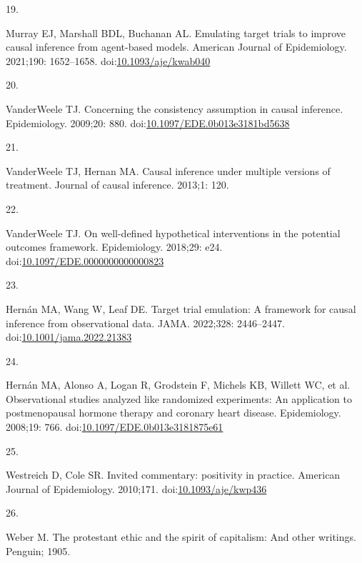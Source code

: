 \documentclass[
  singlecolumn]{article}
\newlength{\cslhangindent}
\newlength{\csllabelwidth}
\newlength{\cslentryspacingunit} %
\newenvironment{CSLReferences}[2] %
 {%
  \setlength{\parindent}{0pt}
  \ifodd #1
  \let\oldpar\par
  \def\par{\hangindent=\cslhangindent\oldpar}
  \fi
  \setlength{\parskip}{#2\cslentryspacingunit}
 }%
 {}
\newcommand{\CSLLeftMargin}[1]{\parbox[t]{\csllabelwidth}{#1}}
\newcommand{\CSLRightInline}[1]{\parbox[t]{\linewidth - \csllabelwidth}{#1}\break}
\begin{document}
\begin{CSLReferences}{0}{0}
\leavevmode{}%
\CSLLeftMargin{19. }%
\CSLRightInline{Murray EJ, Marshall BDL, Buchanan AL. Emulating target
trials to improve causal inference from agent-based models. American
Journal of Epidemiology. 2021;190: 1652--1658.
doi:\href{https://doi.org/10.1093/aje/kwab040}{10.1093/aje/kwab040}}

\leavevmode{}%
\CSLLeftMargin{20. }%
\CSLRightInline{VanderWeele TJ. Concerning the consistency assumption in
causal inference. Epidemiology. 2009;20: 880.
doi:\href{https://doi.org/10.1097/EDE.0b013e3181bd5638}{10.1097/EDE.0b013e3181bd5638}}

\leavevmode{}%
\CSLLeftMargin{21. }%
\CSLRightInline{VanderWeele TJ, Hernan MA. Causal inference under
multiple versions of treatment. Journal of causal inference. 2013;1:
120. }

\leavevmode{}%
\CSLLeftMargin{22. }%
\CSLRightInline{VanderWeele TJ. On well-defined hypothetical
interventions in the potential outcomes framework. Epidemiology.
2018;29: e24.
doi:\href{https://doi.org/10.1097/EDE.0000000000000823}{10.1097/EDE.0000000000000823}}

\leavevmode{}%
\CSLLeftMargin{23. }%
\CSLRightInline{Hernán MA, Wang W, Leaf DE. Target trial emulation: A
framework for causal inference from observational data. JAMA. 2022;328:
2446--2447.
doi:\href{https://doi.org/10.1001/jama.2022.21383}{10.1001/jama.2022.21383}}

\leavevmode{}%
\CSLLeftMargin{24. }%
\CSLRightInline{Hernán MA, Alonso A, Logan R, Grodstein F, Michels KB,
Willett WC, et al. Observational studies analyzed like randomized
experiments: An application to postmenopausal hormone therapy and
coronary heart disease. Epidemiology. 2008;19: 766.
doi:\href{https://doi.org/10.1097/EDE.0b013e3181875e61}{10.1097/EDE.0b013e3181875e61}}

\leavevmode{}%
\CSLLeftMargin{25. }%
\CSLRightInline{Westreich D, Cole SR. Invited commentary: positivity in
practice. American Journal of Epidemiology. 2010;171.
doi:\href{https://doi.org/10.1093/aje/kwp436}{10.1093/aje/kwp436}}

\leavevmode{}%
\CSLLeftMargin{26. }%
\CSLRightInline{Weber M. The protestant ethic and the spirit of
capitalism: And other writings. Penguin; 1905. }


\end{CSLReferences}
\end{document}
